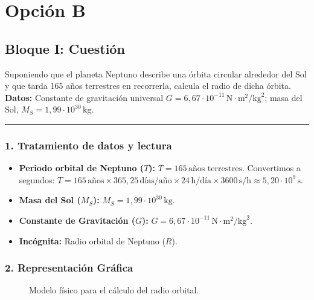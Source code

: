 \newpage

\section{Opción B}
\label{sec:B_2011_jun_ord}

\subsection{Bloque I: Cuestión}
\label{subsec:B1_2011_jun_ord}

\begin{cajaenunciado}
Suponiendo que el planeta Neptuno describe una órbita circular alrededor del Sol y que tarda 165 años terrestres en recorrerla, calcula el radio de dicha órbita.
\textbf{Datos:} Constante de gravitación universal $G=6,67\cdot10^{-11}\,\text{N}\cdot\text{m}^2/\text{kg}^2$; masa del Sol, $M_{S}=1,99\cdot10^{30}\,\text{kg}$.
\end{cajaenunciado}
\hrule

\subsubsection*{1. Tratamiento de datos y lectura}
\begin{itemize}
    \item \textbf{Periodo orbital de Neptuno ($T$):} $T = 165 \, \text{años terrestres}$. Convertimos a segundos:
    $T = 165 \, \text{años} \times 365,25 \, \text{días/año} \times 24 \, \text{h/día} \times 3600 \, \text{s/h} \approx 5,20 \cdot 10^9 \, \text{s}$.
    \item \textbf{Masa del Sol ($M_S$):} $M_S = 1,99 \cdot 10^{30}\,\text{kg}$.
    \item \textbf{Constante de Gravitación ($G$):} $G = 6,67 \cdot 10^{-11}\,\text{N}\cdot\text{m}^2/\text{kg}^2$.
    \item \textbf{Incógnita:} Radio orbital de Neptuno ($R$).
\end{itemize}

\subsubsection*{2. Representación Gráfica}
\begin{figure}[H]
    \centering
    \caption{Modelo físico para el cálculo del radio orbital.}
\end{figure}

